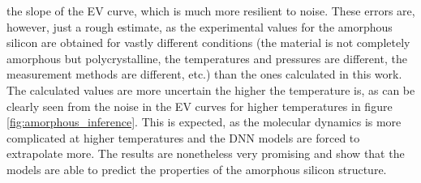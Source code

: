 the slope of the EV curve, which is much more resilient to noise. These errors
are, however, just a rough estimate, as the experimental values for the
amorphous silicon are obtained for vastly different conditions (the material
is not completely amorphous but polycrystalline, the temperatures and
pressures are different, the measurement methods are different, etc.) than the
ones calculated in this work. The calculated values are more uncertain the
higher the temperature is, as can be clearly seen from the noise in the EV
curves for higher temperatures in figure \ref{fig:amorphous_inference}. This
is expected, as the molecular dynamics is more complicated at higher
temperatures and the DNN models are forced to extrapolate more. The results
are nonetheless very promising and show that the models are able to predict
the properties of the amorphous silicon structure.
